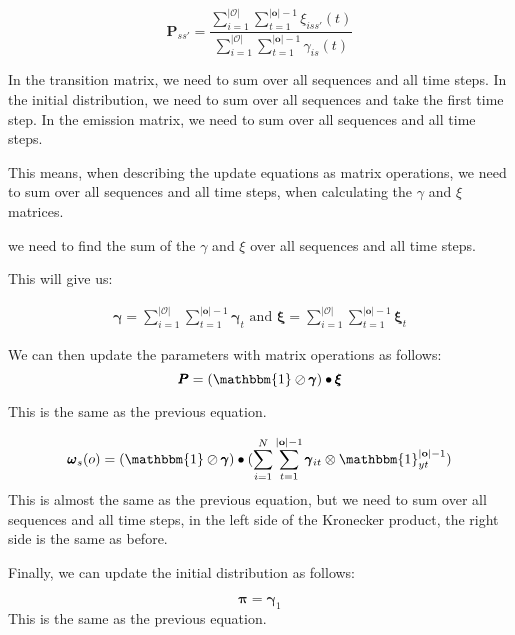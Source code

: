 \begin{equation}
    \pmb{P}_{s s'} = \frac{\sum_{i=1}^{|\mathcal{O}|} \sum_{t = 1}^{|\mathbf{o}|-1} \xi_{iss'}(t)}{\sum_{i=1}^{|\mathcal{O}|} \sum_{t = 1}^{|\mathbf{o}|-1} \gamma_{is}(t)}
\end{equation}

In the transition matrix, we need to sum over all sequences and all time steps.
In the initial distribution, we need to sum over all sequences and take the first time step.
In the emission matrix, we need to sum over all sequences and all time steps.

This means, when describing the update equations as matrix operations, we need to sum over all sequences and all time steps, when calculating the $\gamma$ and $\xi$ matrices.

we need to find the sum of the $\gamma$ and $\xi$ over all sequences and all time steps.

This will give us:

\begin{align}
    \pmb{\gamma} = \sum_{i=1}^{|\mathcal{O}|}\sum_{t=1}^{|\mathbf{o}|-1} \pmb{\gamma}_t
    \text{ and }
    \pmb{\xi} = \sum_{i=1}^{|\mathcal{O}|}\sum_{t=1}^{|\mathbf{o}|-1} \pmb{\xi}_t
\end{align}

We can then update the parameters with matrix operations as follows:
\begin{equation}
    \pmb{P}
    = (\mathbbm{1} \oslash \pmb{\gamma}) \bullet \pmb{\xi}
    \label{eq:transition-probabilities-update}
\end{equation}

This is the same as the previous equation.


\begin{equation}
    \pmb{\omega}
    _s(o) = (\mathbbm{1} \oslash \pmb{\gamma}) \bullet (\sum_{i=1}^N \sum_{t=1}^{|\mathbf{o}|-1} \pmb{\gamma}_{it} \otimes \mathbbm{1}_{yt}^{|\mathbf{o}|-1})
    \label{eq:omega-update}
\end{equation}
This is almost the same as the previous equation, but we need to sum over all sequences and all time steps, in the left side of the Kronecker product, the right side is the same as before.

Finally, we can update the initial distribution as follows:

\begin{equation}
    \pmb{\pi}
    = \pmb{\gamma}_1
    \label{eq:initial-probabilities-update}
\end{equation}
This is the same as the previous equation.

